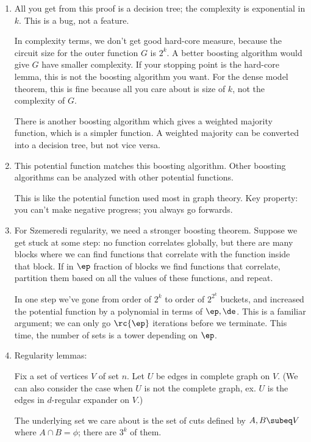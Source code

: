 \begin{enumerate}
\item
All you get from this proof is a decision tree; the complexity is exponential in $k$. This is a bug, not a feature.

In complexity terms, we don't get good hard-core measure, because the circuit size for the outer function $G$ is $2^k$.
A better boosting algorithm would give $G$ have smaller complexity. If your stopping point is the hard-core lemma, this is not the boosting algorithm you want. For the dense model theorem, this is fine because all you care about is size of $k$, not the  complexity of $G$.

There is another boosting algorithm which gives a weighted majority function, which is a simpler function. A weighted majority can be converted into a decision tree, but not vice versa.
\item
This potential function matches this boosting algorithm. Other boosting algorithms can be analyzed with other potential functions. 

This is like the potential function used most in graph theory. Key property: you can't make negative progress; you always go forwards.
\item 
For Szemeredi regularity, we need a stronger boosting theorem. Suppose we get stuck at some step: no function correlates globally, but there are many blocks where we can find functions that correlate with the function inside that block. If in $\ep$ fraction of blocks we find functions that correlate, partition them based on all the values of these functions, and repeat.

In one step we've gone from order of $2^k$ to order of $2^{2^k}$ buckets, and increased the potential function by a polynomial in terms of $\ep,\de$. This is a familiar argument; we can only go $\rc{\ep}$ iterations before we terminate. This time, the number of sets is a tower depending on $\ep$.
\item
Regularity lemmas: 

Fix a set of vertices $V$ of set $n$. Let $U$ be edges in complete graph on $V$.
(We can also consider the case when $U$ is not the complete graph, ex. $U$ is the edges in $d$-regular expander on $V$.)

The underlying set we care about is the set of cuts defined by $A,B\subeq V$ where $A\cap B=\phi$; there are $3^k$ of them.


\end{enumerate}
